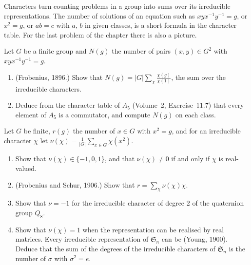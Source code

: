 Characters turn counting problems in a group into sums over its irreducible representations. The number of solutions of an
equation such as $xyx^{-1}y^{-1}=g$, or $x^2=g$, or $ab=c$ with $a$, $b$ in given classes, is a short formula in the
character table. For the last problem of the chapter there is also a picture.

\begin{exercise}[$\star\star$]\label{pb:commutators}
Let $G$ be a finite group and $N(g)$ the number of pairs $(x,y)\in G^2$ with $xyx^{-1}y^{-1}=g$.
\begin{enumerate}[label=(\alph*)]
\item (Frobenius, 1896.) Show that $N(g)=|G|\sum_\chi\frac{\chi(g)}{\chi(1)}$, the sum over the irreducible characters.
\item Deduce from the character table of $A_5$ (Volume~2, Exercise~11.7) that every element of $A_5$ is a commutator,
and compute $N(g)$ on each class.
\end{enumerate}
\end{exercise}

\begin{exercise}[$\star\star\star$]\label{pb:frobschur}
Let $G$ be finite, $r(g)$ the number of $x\in G$ with $x^2=g$, and for an irreducible character $\chi$ let
$\nu(\chi)=\frac1{|G|}\sum_{x\in G}\chi(x^2)$.
\begin{enumerate}[label=(\alph*)]
\item Show that $\nu(\chi)\in\{-1,0,1\}$, and that $\nu(\chi)\ne0$ if and only if $\chi$ is real-valued.
\item (Frobenius and Schur, 1906.) Show that $r=\sum_\chi\nu(\chi)\chi$.
\item Show that $\nu=-1$ for the irreducible character of degree $2$ of the quaternion group $Q_8$.
\item Show that $\nu(\chi)=1$ when the representation can be realised by real matrices. Every irreducible representation of
$\mathfrak S_n$ can be (Young, 1900). Deduce that the sum of the degrees of the irreducible characters of $\mathfrak S_n$ is
the number of $\sigma$ with $\sigma^2=e$.
\end{enumerate}
\end{exercise}

